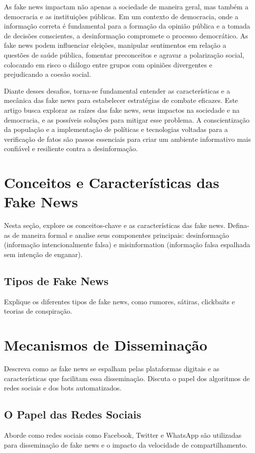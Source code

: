 \documentclass[12pt]{article}
\begin{document}
As fake news impactam não apenas a sociedade de maneira geral, mas também a democracia e as instituições públicas. Em um contexto de democracia, onde a informação correta é fundamental para a formação da opinião pública e a tomada de decisões conscientes, a desinformação compromete o processo democrático. As fake news podem influenciar eleições, manipular sentimentos em relação a questões de saúde pública, fomentar preconceitos e agravar a polarização social, colocando em risco o diálogo entre grupos com opiniões divergentes e prejudicando a coesão social.

Diante desses desafios, torna-se fundamental entender as características e a mecânica das fake news para estabelecer estratégias de combate eficazes. Este artigo busca explorar as raízes das fake news, seus impactos na sociedade e na democracia, e as possíveis soluções para mitigar esse problema. A conscientização da população e a implementação de políticas e tecnologias voltadas para a verificação de fatos são passos essenciais para criar um ambiente informativo mais confiável e resiliente contra a desinformação.


\section{Conceitos e Características das Fake News}
Nesta seção, explore os conceitos-chave e as características das fake news. Defina-as de maneira formal e analise seus componentes principais: desinformação (informação intencionalmente falsa) e misinformation (informação falsa espalhada sem intenção de enganar).

\subsection{Tipos de Fake News}
Explique os diferentes tipos de fake news, como rumores, sátiras, clickbaits e teorias de conspiração. 

\section{Mecanismos de Disseminação}
Descreva como as fake news se espalham pelas plataformas digitais e as características que facilitam essa disseminação. Discuta o papel dos algoritmos de redes sociais e dos bots automatizados.

\subsection{O Papel das Redes Sociais}
Aborde como redes sociais como Facebook, Twitter e WhatsApp são utilizadas para disseminação de fake news e o impacto da velocidade de compartilhamento.
\end{document}
